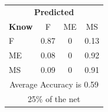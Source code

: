 \documentclass[12pt]{article} %
\begin{document}
\begin{minipage}{0.5\textwidth}
\begin{center}
\begin{tabular}{l|c|c|c|}
 \multicolumn{4}{c}{ \textbf{ Predicted}}\\
 \textbf{Know}&F&ME&MS\\ \hline\hline
F   &0.87&0&0.13\\
ME &0.08&0&0.92\\
MS &0.09&0&0.91\\
\multicolumn{4}{c}{Average Accuracy is 0.59}\\
\multicolumn{4}{c}{25\%  of the net}\\
\end{tabular}
\end{center}
\end{minipage}

\newpage
\end{document}
